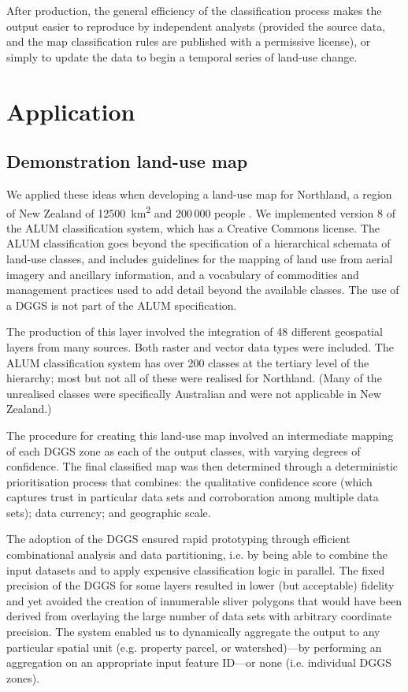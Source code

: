 \documentclass[]{interact}
\theoremstyle{plain}%
\theoremstyle{definition}
\theoremstyle{remark}
\begin{document}
After production, the general efficiency of the classification process makes the output easier to reproduce by independent analysts (provided the source data, and the map classification rules are published with a permissive license), or simply to update the data to begin a temporal series of land-use change.

\section{Application} %

\subsection{Demonstration land-use map}

We applied these ideas when developing a land-use map for Northland, a region of New Zealand of \qty{12500}{\km\squared} and 200\,000 people \citep[see][]{law2023}. We implemented version 8 of the \ac{ALUM} classification system, which has a Creative Commons license. The \ac{ALUM} classification goes beyond the specification of a hierarchical schemata of land-use classes, and includes guidelines for the mapping of land use from aerial imagery and ancillary information, and a vocabulary of commodities and management practices used to add detail beyond the available classes. The use of a \ac{DGGS} is not part of the \ac{ALUM} specification.

The production of this layer involved the integration of 48 different geospatial layers from many sources. Both raster and vector data types were included. The \ac{ALUM} classification system has over 200 classes at the tertiary level of the hierarchy; most but not all of these were realised for Northland. (Many of the unrealised classes were specifically Australian and were not applicable in New Zealand.)

The procedure for creating this land-use map involved an intermediate mapping of each \ac{DGGS} zone as each of the output classes, with varying degrees of confidence. The final classified map was then determined through a deterministic prioritisation process that combines: the qualitative confidence score (which captures trust in particular data sets and corroboration among multiple data sets); data currency; and geographic scale.

The adoption of the \ac{DGGS} ensured rapid prototyping through efficient combinational analysis and data partitioning, i.e. by being able to combine the input datasets and to apply expensive classification logic in parallel. The fixed precision of the \ac{DGGS} for some layers resulted in lower (but acceptable) fidelity and yet avoided the creation of innumerable sliver polygons that would have been derived from overlaying the large number of data sets with arbitrary coordinate precision. The system enabled us to dynamically aggregate the output to any particular spatial unit (e.g. property parcel, or watershed)---by performing an aggregation on an appropriate input feature ID---or none (i.e. individual \ac{DGGS} zones).
\end{document}
